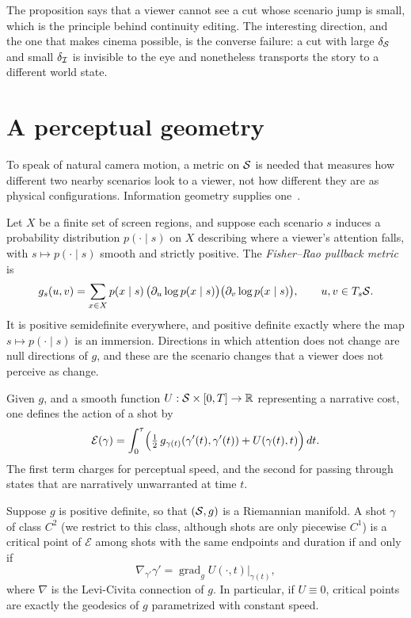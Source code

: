 The proposition says that a viewer cannot see a cut whose scenario jump is small, which is the principle behind continuity editing. The interesting direction, and the one that makes cinema possible, is the converse failure: a cut with large $\delta_{\mathcal{S}}$ and small $\delta_{\mathcal{I}}$ is invisible to the eye and nonetheless transports the story to a different world state.

\section{A perceptual geometry}

To speak of natural camera motion, a metric on $\mathcal{S}$ is needed that measures how different two nearby scenarios look to a viewer, not how different they are as physical configurations. Information geometry supplies one~\cite{amari2016}.

Let $X$ be a finite set of screen regions, and suppose each scenario $s$ induces a probability distribution $p(\cdot\mid s)$ on $X$ describing where a viewer's attention falls, with $s\mapsto p(\cdot\mid s)$ smooth and strictly positive. The \emph{Fisher--Rao pullback metric} is
\[
g_s(u,v)=\sum_{x\in X}p(x\mid s)\,\bigl(\partial_u\log p(x\mid s)\bigr)\bigl(\partial_v\log p(x\mid s)\bigr),\qquad u,v\in T_s\mathcal{S}.
\]
It is positive semidefinite everywhere, and positive definite exactly where the map $s\mapsto p(\cdot\mid s)$ is an immersion. Directions in which attention does not change are null directions of $g$, and these are the scenario changes that a viewer does not perceive as change.

Given $g$, and a smooth function $U:\mathcal{S}\times[0,T]\to\mathbb{R}$ representing a narrative cost, one defines the action of a shot by
\[
\mathcal{E}(\gamma)=\int_0^{\tau}\Bigl(\tfrac12\,g_{\gamma(t)}(\gamma'(t),\gamma'(t))+U(\gamma(t),t)\Bigr)\,dt.
\]
The first term charges for perceptual speed, and the second for passing through states that are narratively unwarranted at time $t$.

\begin{proposition}\label{prop:EL}
Suppose $g$ is positive definite, so that $(\mathcal{S},g)$ is a Riemannian manifold. A shot $\gamma$ of class $C^2$ (we restrict to this class, although shots are only piecewise $C^1$) is a critical point of $\mathcal{E}$ among shots with the same endpoints and duration if and only if
\[
\nabla_{\gamma'}\gamma'=\operatorname{grad}_g U(\cdot,t)\big|_{\gamma(t)},
\]
where $\nabla$ is the Levi-Civita connection of $g$. In particular, if $U\equiv0$, critical points are exactly the geodesics of $g$ parametrized with constant speed.
\end{proposition}

